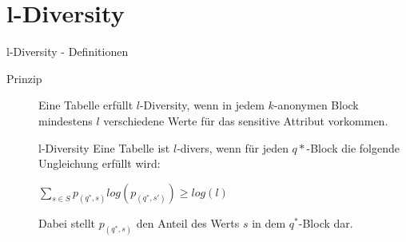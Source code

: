 \section{l-Diversity}

\begin{frame}{l-Diversity - Definitionen}

\begin{description}
	\item[Prinzip] Eine Tabelle erfüllt \(l\)-Diversity, wenn in jedem \(k\)-anonymen Block mindestens \(l\) verschiedene Werte für das sensitive Attribut vorkommen.
    
    \vfill
    
	\begin{block}{l-Diversity}
    \centering
        Eine Tabelle ist \(l\)-divers, wenn für jeden $q*$-Block die folgende Ungleichung erfüllt wird:
        
    	$\sum\limits_{s \in S} p_{(q^*,s)} log(p_{(q^*,s')}) \geq log(l)$
        
    	Dabei stellt $p_{(q^*,s)}$ den Anteil des Werts $s$ in dem $q^*$-Block dar.
    \end{block}
    
\end{description}

\end{frame}

